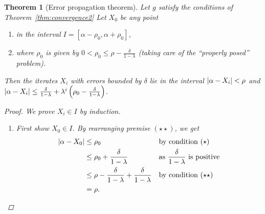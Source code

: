 \documentclass[12pt,letterpaper,DIV=11]{scrartcl}
\theoremstyle{plain}
\newtheorem{theorem}{Theorem}[section]
\theoremstyle{definition}
\theoremstyle{remark}
\begin{document}
\begin{theorem}[Error propagation theorem]
  Let $g$ satisfy the conditions of Theorem~\ref{thm:convergence2}
  Let $X_0$ be any point \begin{enumerate}
    \item[$(\star)$] in the interval $I = [\alpha - \rho_0, \alpha + \rho_0]$,
    \item[$(\star\star)$] where $\rho_0$ is given by $0 < \rho_0 \leq \rho - \frac{\delta}{1 - \lambda}$ (taking care of the \enquote{properly posed} problem).
  \end{enumerate}
  Then the iterates $X_i$ with errors bounded by $\delta$ lie in the interval $\left\lvert\alpha - X_i\right\rvert < \rho$ and $\left\lvert\alpha - X_i\right\rvert \leq \frac{\delta}{1 - \lambda} + \lambda^i \left( \rho_0 - \frac{\delta}{1 - \lambda} \right)$.

  \begin{proof}
    We prove $X_i \in I$ by induction.
    \begin{enumerate}
      \item First show $X_0 \in I$.
        By rearranging premise $(\star\star)$, we get \begin{align*}
          \left\lvert\alpha - X_0\right\rvert &\leq \rho_0 && \text{by condition $(\star)$} \\
                             &\leq \rho_0 + \frac{\delta}{1 - \lambda} && \text{as $\frac{\delta}{1 - \lambda}$ is positive} \\
                             &\leq \rho - \frac{\delta}{1 - \lambda} + \frac{\delta}{1 - \lambda} && \text{by condition $(\star\star)$} \\
                             &= \rho.
        \end{align*}


\end{enumerate}
\end{proof}
\end{theorem}
\end{document}
